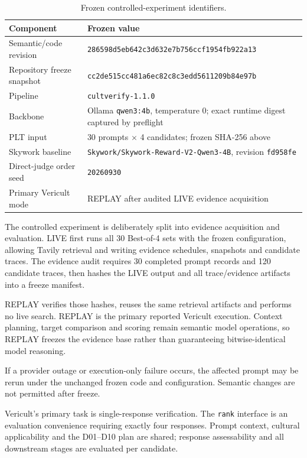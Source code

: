 \begin{table}[htbp]
\centering
\footnotesize
\caption{Frozen controlled-experiment identifiers.}
\label{tab:frozen-experiment}
\begin{tabularx}{\textwidth}{p{4.2cm}X}
\toprule
\textbf{Component} & \textbf{Frozen value} \\
\midrule
Semantic/code revision & \texttt{286598d5eb642c3d632e7b756ccf1954fb922a13} \\
Repository freeze snapshot & \texttt{cc2de515cc481a6ec82c8c3edd5611209b84e97b} \\
Pipeline & \texttt{cultverify-1.1.0} \\
Backbone & Ollama \texttt{qwen3:4b}, temperature 0; exact runtime digest captured by preflight \\
PLT input & 30 prompts $\times$ 4 candidates; frozen SHA-256 above \\
Skywork baseline & \texttt{Skywork/Skywork-Reward-V2-Qwen3-4B}, revision \texttt{fd958fe} \\
Direct-judge order seed & \texttt{20260930} \\
Primary Vericult mode & REPLAY after audited LIVE evidence acquisition \\
\bottomrule
\end{tabularx}
\end{table}

The controlled experiment is deliberately split into evidence acquisition and evaluation. LIVE first runs all 30 Best-of-4 sets with the frozen configuration, allowing Tavily retrieval and writing evidence schedules, snapshots and candidate traces. The evidence audit requires 30 completed prompt records and 120 candidate traces, then hashes the LIVE output and all trace/evidence artifacts into a freeze manifest.

REPLAY verifies those hashes, reuses the same retrieval artifacts and performs no live search. REPLAY is the primary reported Vericult execution. Context planning, target comparison and scoring remain semantic model operations, so REPLAY freezes the evidence base rather than guaranteeing bitwise-identical model reasoning.

If a provider outage or execution-only failure occurs, the affected prompt may be rerun under the unchanged frozen code and configuration. Semantic changes are not permitted after freeze.

Vericult's primary task is single-response verification. The \texttt{rank} interface is an evaluation convenience requiring exactly four responses. Prompt context, cultural applicability and the D01--D10 plan are shared; response assessability and all downstream stages are evaluated per candidate.

